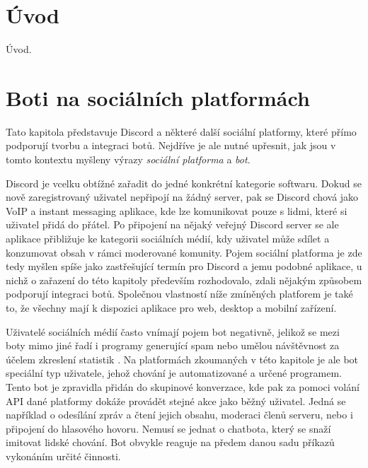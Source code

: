 \documentclass[FM]{tulthesis}
\begin{document}
	
	
	\chapter{Úvod}
	
	Úvod.
	
	\chapter{Boti na sociálních platformách}
	
	Tato kapitola představuje Discord a některé další sociální platformy, které přímo podporují tvorbu a integraci botů. Nejdříve je ale nutné upřesnit, jak jsou v tomto kontextu myšleny výrazy \textit{sociální platforma} a \textit{bot}.
	
	Discord je vcelku obtížné zařadit do jedné konkrétní kategorie softwaru. Dokud se nově zaregistrovaný uživatel nepřipojí na žádný server, pak se Discord chová jako VoIP a instant messaging aplikace, kde lze komunikovat pouze s lidmi, které si uživatel přidá do přátel. Po připojení na nějaký veřejný Discord server se ale aplikace přibližuje ke kategorii sociálních médií, kdy uživatel může sdílet a konzumovat obsah v rámci moderované komunity. Pojem sociální platforma je zde tedy myšlen spíše jako zastřešující termín pro Discord a jemu podobné aplikace, u nichž o zařazení do této kapitoly především rozhodovalo, zdali nějakým způsobem podporují integraci botů. Společnou vlastností níže zmíněných platforem je také to, že všechny mají k dispozici aplikace pro web, desktop a mobilní zařízení.
	
	Uživatelé sociálních médií často vnímají pojem bot negativně, jelikož se mezi boty mimo jiné řadí i programy generující spam nebo umělou návštěvnost za účelem zkreslení statistik \cite{lit_Discord}. Na platformách zkoumaných v této kapitole je ale bot speciální typ uživatele, jehož chování je automatizované a určené programem. Tento bot je zpravidla přidán do skupinové konverzace, kde pak za pomoci volání API dané platformy dokáže provádět stejné akce jako běžný uživatel. Jedná se například o odesílání zpráv a čtení jejich obsahu, moderaci členů serveru, nebo i připojení do hlasového hovoru. Nemusí se jednat o chatbota, který se snaží imitovat lidské chování. Bot obvykle reaguje na předem danou sadu příkazů vykonáním určité činnosti.
		
\end{document}
